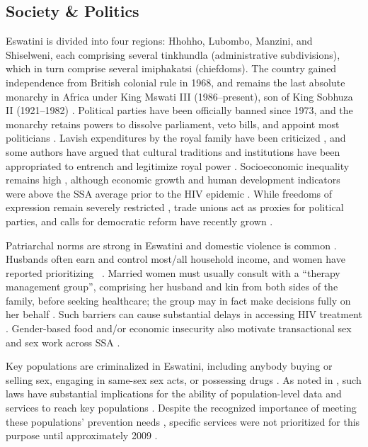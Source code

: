 \subsection{Society \& Politics}\label{intro.esw.soc}
Eswatini is divided into four regions: Hhohho, Lubombo, Manzini, and Shiselweni,
each comprising several tinkhundla (administrative subdivisions),
which in turn comprise several imiphakatsi (chiefdoms).
The country gained independence from British colonial rule in 1968,
and remains the last absolute monarchy in Africa
under King Mswati III (1986--present), son of King Sobhuza II (1921--1982) \cite{Mthembu2022}.
Political parties have been officially banned since 1973,
and the monarchy retains powers to
dissolve parliament, veto bills, and appoint most politicians \cite{Maphalala2021}.
Lavish expenditures by the royal family have been criticized \cite{Debly2014,Mthembu2022},
and some authors have argued that cultural traditions and institutions
have been appropriated to entrench and legitimize royal power \cite{Debly2014,Golomski2019}.
Socioeconomic inequality remains high \cite{Debly2014,Kali2023,DataBank},
although economic growth and human development indicators
were above the SSA average prior to the HIV epidemic \cite{Whiteside2007}.
While freedoms of expression remain severely restricted \cite{Debly2014,Mthembu2022},
trade unions act as proxies for political parties,
and calls for democratic reform have recently grown
\cite{Debly2014,Maphalala2021,Mthembu2022,Maseko2023}.
\par
Patriarchal norms are strong in Eswatini and domestic violence is common
\cite{Buseh2002,Whiteside2003,Simelane2011,Dlamini-Simelane2017,Golomski2019}.
Husbands often earn and control most/all household income, and women have reported prioritizing
~\cite{Dlamini-Simelane2017}.
Married women must usually consult with a ``therapy management group'',
comprising her husband and kin from both sides of the family, before seeking healthcare;
the group may in fact make decisions fully on her behalf \cite{Dlamini-Simelane2017}.
Such barriers can cause substantial delays in accessing HIV treatment \cite{Dlamini-Simelane2017}.
Gender-based food and/or economic insecurity also motivate
transactional sex and sex work across SSA \cite{Scorgie2012}.
\par
Key populations are criminalized in Eswatini, including anybody
buying or selling sex, engaging in same-sex sex acts, or possessing drugs \cite{UNAIDS2022lpa}.
As noted in , such laws have substantial implications for
the ability of population-level data and services to reach key populations \cite{WHO2016kp}.
Despite the recognized importance of meeting these populations' prevention needs \cite{EswBSS2002},
specific services were not prioritized for this purpose until approximately 2009 \cite{NERCHA2009}.
\pagebreak %
